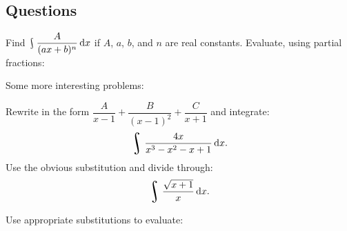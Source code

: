 \subsection*{Questions}
\begin{questions}
  \questioS Find $ \rint \dfrac{A}{(ax + b)^n} \dif{x} $ if $ A $, $ a $, $ b $, and $ n $ are real constants.
  \questioS Evaluate, using partial fractions:
  \question Some more interesting problems:
      \begin{parts}
        \parS Rewrite in the form $ \dfrac{A}{x-1} + \dfrac{B}{(x-1)^2} + \dfrac{C}{x + 1} $ and integrate:
          \begin{displaymath}
            \rint \dfrac{4x}{x^3 - x^2 - x + 1} \dif{x}.
          \end{displaymath}
        \parS Use the obvious substitution and divide through:
          \begin{displaymath}
            \rint \dfrac{\sqrt{x+1}}{x} \dif{x}.
          \end{displaymath}
      \end{parts}
  \questioS Use appropriate substitutions to evaluate:
    \begin{parts}

\end{parts}
\end{questions}
